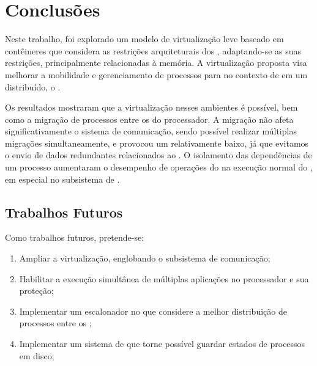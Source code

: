 \glsresetall
\chapter{Conclusões}
\label{chap.conclusions}

Neste trabalho, foi explorado um modelo de virtualização leve baseado em contêineres que considera as restrições arquiteturais dos \lws, adaptando-se as suas restrições, principalmente relacionadas à memória. A virtualização proposta visa melhorar a mobilidade e gerenciamento de processos para \lws no contexto de em um \os distribuído, o \nanvix.
%

Os resultados mostraram que a virtualização nesses ambientes é possível, bem como a migração de processos entre os \clusters do processador. A migração não afeta significativamente o sistema de comunicação, sendo possível realizar múltiplas migrações simultaneamente, e provocou um \downtime relativamente baixo, já que evitamos o envio de dados redundantes \eg relacionados ao . O isolamento das dependências de um processo aumentaram o desempenho de operações do  na execução normal do \so, em especial no subsistema de \threads.

\section{Trabalhos Futuros}
Como trabalhos futuros, pretende-se:

\begin{enumerate}[label=(\roman*)]
    \item Ampliar a virtualização, englobando o subsistema de comunicação;
    \item Habilitar a execução simultânea de múltiplas aplicações no processador e sua proteção;
    \item Implementar um escalonador no \nanvix que considere a melhor distribuição de processos entre os \clusters;
    \item Implementar um sistema de \checkpointing que torne possível guardar estados de processos em disco;
\end{enumerate}

